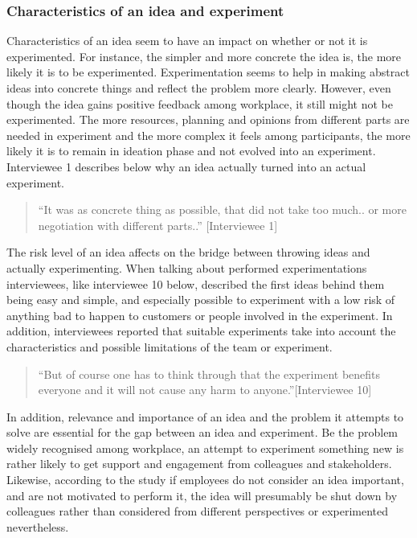 \subsubsection{Characteristics of an idea and experiment}
Characteristics of an idea seem to have an impact on whether or not it is experimented. For instance, the simpler and more concrete the idea is, the more likely it is to be experimented. Experimentation seems to help in making abstract ideas into concrete things and reflect the problem more clearly. However, even though the idea gains positive feedback among workplace, it still might not be experimented. The more resources, planning and opinions from different parts are needed in experiment and the more complex it feels among participants, the more likely it is to remain in ideation phase and not evolved into an experiment.  Interviewee 1 describes below why an idea actually turned into an actual experiment.
\begin{quote}
``It was as concrete thing as possible, that did not take too much.. or more negotiation with different parts..'' [Interviewee 1]
\end{quote}
The risk level of an idea affects on the bridge between throwing ideas and actually experimenting. When talking about performed experimentations interviewees, like interviewee 10 below, described the first ideas behind them being easy and simple, and especially possible to experiment with a low risk of anything bad to happen to customers or people involved in the experiment. In addition, interviewees reported that suitable experiments take into account the characteristics and possible limitations of the team or experiment. 
\begin{quote}
``But of course one has to think through that the experiment benefits everyone and it will not cause any harm to anyone.''[Interviewee 10]
\end{quote}
In addition, relevance and importance of an idea and the problem it attempts to solve are essential for the gap between an idea and experiment. Be the problem widely recognised among workplace, an attempt to experiment something new is rather likely to get support and engagement from colleagues and stakeholders. Likewise, according to the study if employees do not consider an idea important, and are not motivated to perform it, the idea will presumably be shut down by colleagues rather than considered from different perspectives or experimented nevertheless. 


